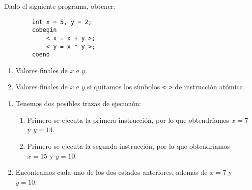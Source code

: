 \begin{ejercicio}
    Dado el siguiente programa, obtener:
    \begin{verbatim}
        int x = 5, y = 2;
        cobegin
            < x = x + y >;
            < y = x * y >;
        coend
    \end{verbatim}
    \begin{enumerate}
        \item Valores finales de $x$ e $y$.
        \item Valores finales de $x$ e $y$ si quitamos los símbolos \verb|< >| de instrucción atómica.
    \end{enumerate}
    \begin{enumerate}
        \item Tenemos dos posibles trazas de ejecución:
            \begin{enumerate}
                \item Primero se ejecuta la primera instrucción, por lo que obtendríamos $x = 7$ y $y = 14$.
                \item Primero se ejecuta la segunda instrucción, por lo que obtendríamos $x = 15$ y $y = 10$.
            \end{enumerate}
        \item Encontramos cada uno de los dos estados anteriores, además de $x = 7$ y $y= 10$.
    \end{enumerate}
\end{ejercicio}

